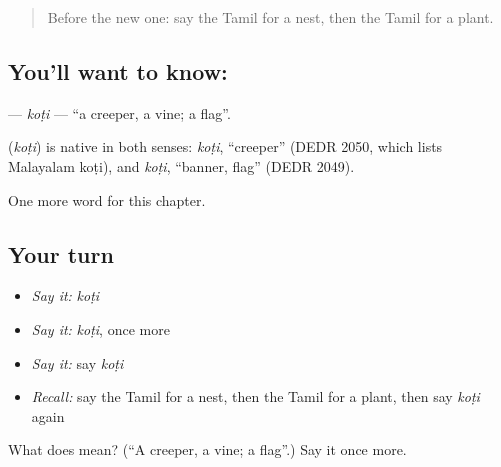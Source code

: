 \label{lesson:TA-C275-koti2}



\begin{quote}
Before the new one: say the Tamil for a nest, then the Tamil for a plant.
\end{quote}

\subsection*{You'll want to know: }
\textbf{} — \emph{koṭi} — \textquotedblleft{}a creeper, a vine; a flag\textquotedblright{}.

\begin{cousinweb}
\textbf{} (\emph{koṭi}) is native in both senses: \emph{koṭi}, \textquotedblleft{}creeper\textquotedblright{} (DEDR 2050, which lists Malayalam koṭi), and \emph{koṭi}, \textquotedblleft{}banner, flag\textquotedblright{} (DEDR 2049).
\end{cousinweb}

\begin{grammarlens}[title={What you've built}]
One more word for this chapter.
\end{grammarlens}

\subsection*{Your turn}
\begin{itemize}
\raggedright
  \item \emph{Say it:} \emph{koṭi}
  \item \emph{Say it:} \emph{koṭi}, once more
  \item \emph{Say it:} say \emph{koṭi}
  \item \emph{Recall:} say the Tamil for a nest, then the Tamil for a plant, then say \emph{koṭi} again
\end{itemize}

\begin{tcolorbox}[breakable,colback=teal!4,colframe=teal!35!black,title={Before you move on}]
What does  mean? (\textquotedblleft{}A creeper, a vine; a flag\textquotedblright{}.) Say it once more.
\end{tcolorbox}
